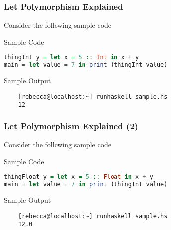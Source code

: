 \documentclass{beamer}
\begin{document}
\begin{frame}[fragile]
  \frametitle{Let Polymorphism Explained}
  Consider the following sample code
  \begin{exampleblock}{Sample Code}
    \begin{lstlisting}[language=Haskell]
thingInt y = let x = 5 :: Int in x + y
main = let value = 7 in print (thingInt value)
    \end{lstlisting}
  \end{exampleblock}

  \begin{exampleblock}{Sample Output}
    \begin{verbatim}
    [rebecca@localhost:~] runhaskell sample.hs
    12
\end{verbatim}
  \end{exampleblock}
\end{frame}

\begin{frame}[fragile]
  \frametitle{Let Polymorphism Explained (2)}
  Consider the following sample code
  \begin{exampleblock}{Sample Code}
    \begin{lstlisting}[language=Haskell]
thingFloat y = let x = 5 :: Float in x + y
main = let value = 7 in print (thingInt value)
    \end{lstlisting}
  \end{exampleblock}

  \begin{exampleblock}{Sample Output}
    \begin{verbatim}
    [rebecca@localhost:~] runhaskell sample.hs
    12.0
\end{verbatim}
  \end{exampleblock}
\end{frame}
\end{document}
